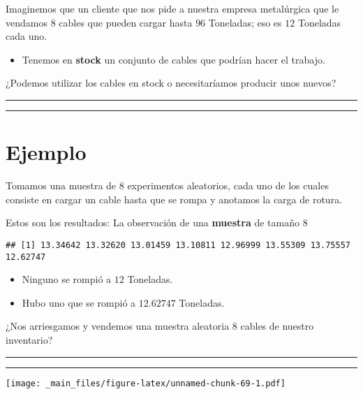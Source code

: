 \documentclass[
]{book}
\providecommand{\tightlist}{%
  \setlength{\itemsep}{0pt}\setlength{\parskip}{0pt}}
\begin{document}
Imaginemos que un cliente que nos pide a nuestra empresa metalúrgica que le vendamos \(8\) cables que pueden cargar hasta \(96\) Toneladas; eso es \(12\) Toneladas cada uno.

\begin{itemize}
\tightlist
\item
  Tenemos en \textbf{stock} un conjunto de cables que podrían hacer el trabajo.
\end{itemize}

¿Podemos utilizar los cables en stock o necesitaríamos producir unos nuevos?

\begin{center}\rule{0.5\linewidth}{0.5pt}\end{center}

\begin{center}\rule{0.5\linewidth}{0.5pt}\end{center}

\hypertarget{ejemplo-12}{%
\section{Ejemplo}\label{ejemplo-12}}

Tomamos una muestra de \(8\) experimentos aleatorios, cada uno de los cuales consiste en cargar un cable hasta que se rompa y anotamos la carga de rotura.

Estos son los resultados: La observación de una \textbf{muestra} de tamaño \(8\)

\begin{verbatim}
## [1] 13.34642 13.32620 13.01459 13.10811 12.96999 13.55309 13.75557 12.62747
\end{verbatim}

\begin{itemize}
\item
  Ninguno se rompió a \(12\) Toneladas.
\item
  Hubo uno que se rompió a \(12.62747\) Toneladas.
\end{itemize}

¿Nos arriesgamos y vendemos una muestra aleatoria \(8\) cables de nuestro inventario?

\begin{center}\rule{0.5\linewidth}{0.5pt}\end{center}

\begin{center}\rule{0.5\linewidth}{0.5pt}\end{center}

\texttt{[image: \_main\_files/figure-latex/unnamed-chunk-69-1.pdf]}
\end{document}
